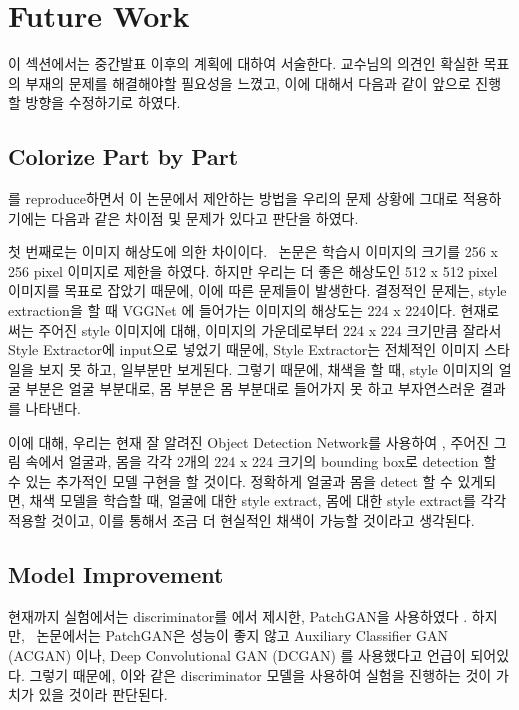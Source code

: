 \section{Future Work}

이 섹션에서는 중간발표 이후의 계획에 대하여 서술한다.
교수님의 의견인 확실한 목표의 부재의 문제를 해결해야할 필요성을 느꼈고, 이에 대해서 다음과 같이 앞으로 진행할 방향을 수정하기로 하였다.

\subsection{Colorize Part by Part}

\stylepaint 를 reproduce하면서 이 논문에서 제안하는 방법을 우리의 문제 상황에 그대로 적용하기에는 다음과 같은 차이점 및 문제가 있다고 판단을 하였다.

첫 번째로는 이미지 해상도에 의한 차이이다. \stylepaint~논문은 학습시 이미지의 크기를 256 x 256 pixel 이미지로 제한을 하였다.
하지만 우리는 더 좋은 해상도인 512 x 512 pixel 이미지를 목표로 잡았기 때문에, 이에 따른 문제들이 발생한다. 결정적인 문제는, style extraction을 할 때 VGGNet \cite{Simonyan2014}에 들어가는 이미지의 해상도는 224 x 224이다.
현재로써는 주어진 style 이미지에 대해, 이미지의 가운데로부터 224 x 224 크기만큼 잘라서 Style Extractor에 input으로 넣었기 때문에, Style Extractor는 전체적인 이미지 스타일을 보지 못 하고, 일부분만 보게된다. 그렇기 때문에, 채색을 할 때, style 이미지의 얼굴 부분은 얼굴 부분대로, 몸 부분은 몸 부분대로 들어가지 못 하고 부자연스러운 결과를 나타낸다.

이에 대해, 우리는 현재 잘 알려진 Object Detection Network를 사용하여 \cite{Ross2015, Ross2014,Kaiming2017, Joseph2016}, 주어진 그림 속에서 얼굴과, 몸을 각각 2개의 224 x 224 크기의 bounding box로 detection 할 수 있는 추가적인 모델 구현을 할 것이다. 정확하게 얼굴과 몸을 detect 할 수 있게되면, 채색 모델을 학습할 때, 얼굴에 대한 style extract, 몸에 대한 style extract를 각각 적용할 것이고, 이를 통해서 조금 더 현실적인 채색이 가능할 것이라고 생각된다.

\subsection{Model Improvement}

현재까지 실험에서는 discriminator를 \pixpix 에서 제시한, PatchGAN을 사용하였다 \cite{phillip2017}.
하지만, \stylepaint~논문에서는 PatchGAN은 성능이 좋지 않고 Auxiliary Classifier GAN (ACGAN) \cite{Odena2017}이나, Deep Convolutional GAN (DCGAN) \cite{Radford2015}를 사용했다고 언급이 되어있다.
그렇기 때문에, 이와 같은 discriminator 모델을 사용하여 실험을 진행하는 것이 가치가 있을 것이라 판단된다.


